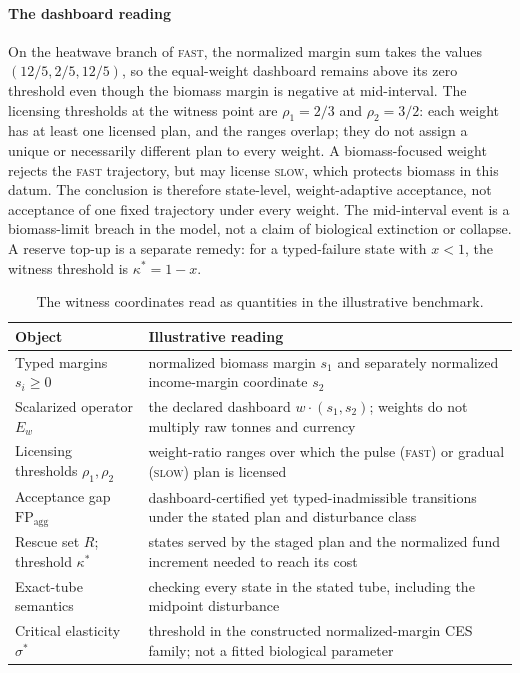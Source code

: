 \documentclass[preprint,11pt,authoryear]{elsarticle}
\theoremstyle{definition}
\theoremstyle{remark}
\newcommand{\FP}{\mathrm{FP}_{\mathrm{agg}}}
\newcommand{\act}[1]{\textsc{#1}}
\begin{document}
\paragraph{The dashboard reading} On the heatwave branch of \act{fast}, the normalized margin sum takes the values $(12/5,2/5,12/5)$, so the equal-weight dashboard remains above its zero threshold even though the biomass margin is negative at mid-interval. The licensing thresholds at the witness point are $\rho_1=2/3$ and $\rho_2=3/2$: each weight has at least one licensed plan, and the ranges overlap; they do not assign a unique or necessarily different plan to every weight. A biomass-focused weight rejects the \act{fast} trajectory, but may license \act{slow}, which protects biomass in this datum. The conclusion is therefore state-level, weight-adaptive acceptance, not acceptance of one fixed trajectory under every weight. The mid-interval event is a biomass-limit breach in the model, not a claim of biological extinction or collapse. A reserve top-up is a separate remedy: for a typed-failure state with $x<1$, the witness threshold is $\kappa^*=1-x$.

\begin{table}[!htbp]
\centering\small
\caption{The witness coordinates read as quantities in the illustrative benchmark.}
\label{tab:fisheries}
\begin{tabularx}{\textwidth}{@{}>{\raggedright\arraybackslash}p{}X@{}}
\toprule
Object & Illustrative reading \\
\midrule
Typed margins $s_i\ge0$ & normalized biomass margin $s_1$ and separately normalized income-margin coordinate $s_2$ \\
Scalarized operator $E_w$ & the declared dashboard $w\cdot(s_1,s_2)$; weights do not multiply raw tonnes and currency \\
Licensing thresholds $\rho_1,\rho_2$ & weight-ratio ranges over which the pulse (\act{fast}) or gradual (\act{slow}) plan is licensed \\
Acceptance gap $\FP$ & dashboard-certified yet typed-inadmissible transitions under the stated plan and disturbance class \\
Rescue set $R$; threshold $\kappa^*$ & states served by the staged plan and the normalized fund increment needed to reach its cost \\
Exact-tube semantics & checking every state in the stated tube, including the midpoint disturbance \\
Critical elasticity $\sigma^*$ & threshold in the constructed normalized-margin CES family; not a fitted biological parameter \\
\bottomrule
\end{tabularx}
\end{table}
\end{document}
